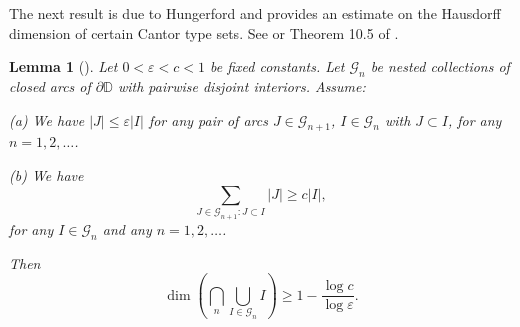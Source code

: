 \documentclass[a4paper,12pt]{article}
\newtheorem{lem}{Lemma}[section]
\theoremstyle{definition}
\numberwithin{equation}{section}
\begin{document}
\medskip

The next result is due to Hungerford and provides an estimate on the Hausdorff dimension of certain Cantor type sets. See \cite{Hun} or Theorem 10.5 of \cite{pom}. 

\begin{lem}[\cite{Hun}]
    \label{hungerford}
    Let $0<\varepsilon<c<1$ be fixed constants. Let $\mathcal{G}_{n}$ be nested collections of closed arcs of $\partial \mathbb{D}$ with pairwise disjoint interiors. Assume:
    
(a) We have $|J| \leq \varepsilon |I|$ for any pair of arcs $J \in \mathcal{G}_{n+1}$, $ I \in \mathcal{G}_{n}$ with $J \subset I$, for any $n=1,2, \ldots$.

(b) We have
$$
\sum_{J \in \mathcal{G}_{n+1}: J \subset I} |J| \geqslant c |I|, 
$$
for any $I \in \mathcal{G}_{n}$ and any $n=1,2, \ldots$.

Then 
$$
\operatorname{dim}\left(\bigcap_{n} \bigcup_{I \in \mathcal{G}_{n}} I \right) \geqslant 1-\frac{\log c}{\log \varepsilon}. 
$$
\end{lem}

\medskip
\end{document}
